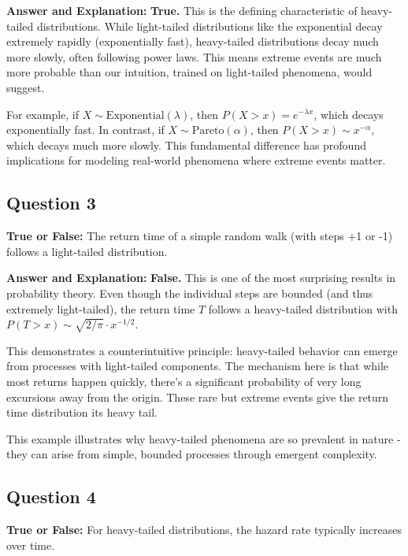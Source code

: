 \documentclass[11pt]{article}
\newenvironment{answer}{\color{answercolor}\begin{framed}\textbf{Answer and Explanation:}}{\end{framed}}
\begin{document}
\begin{answer}
\textbf{True.} This is the defining characteristic of heavy-tailed distributions. While light-tailed distributions like the exponential decay extremely rapidly (exponentially fast), heavy-tailed distributions decay much more slowly, often following power laws. This means extreme events are much more probable than our intuition, trained on light-tailed phenomena, would suggest.

For example, if $X \sim \text{Exponential}(\lambda)$, then $P(X > x) = e^{-\lambda x}$, which decays exponentially fast. In contrast, if $X \sim \text{Pareto}(\alpha)$, then $P(X > x) \sim x^{-\alpha}$, which decays much more slowly. This fundamental difference has profound implications for modeling real-world phenomena where extreme events matter.
\end{answer}

\subsection{Question 3}
\textbf{True or False:} The return time of a simple random walk (with steps +1 or -1) follows a light-tailed distribution.

\begin{answer}
\textbf{False.} This is one of the most surprising results in probability theory. Even though the individual steps are bounded (and thus extremely light-tailed), the return time $T$ follows a heavy-tailed distribution with $P(T > x) \sim \sqrt{2/\pi} \cdot x^{-1/2}$.

This demonstrates a counterintuitive principle: heavy-tailed behavior can emerge from processes with light-tailed components. The mechanism here is that while most returns happen quickly, there's a significant probability of very long excursions away from the origin. These rare but extreme events give the return time distribution its heavy tail.

This example illustrates why heavy-tailed phenomena are so prevalent in nature - they can arise from simple, bounded processes through emergent complexity.
\end{answer}

\subsection{Question 4}
\textbf{True or False:} For heavy-tailed distributions, the hazard rate typically increases over time.
\end{document}

